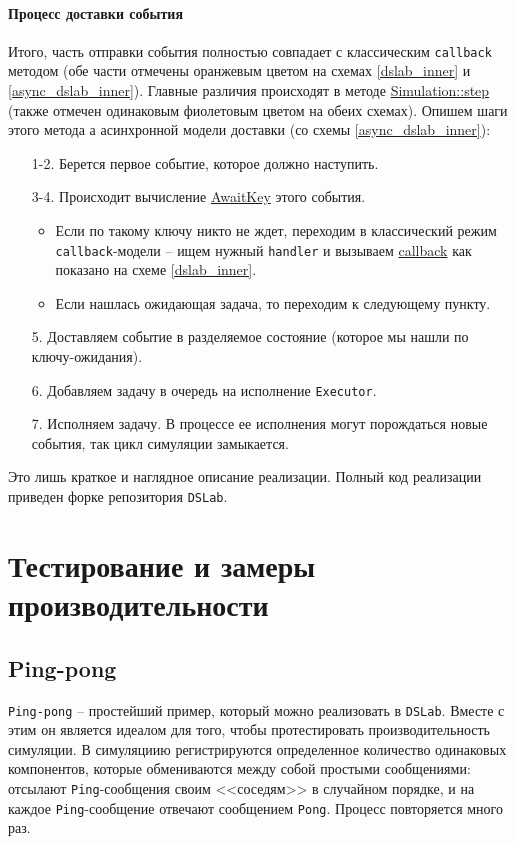 \paragraph{Процесс доставки события} Итого, часть отправки события полностью совпадает с классическим \texttt{callback} методом (обе части отмечены оранжевым цветом на схемах \ref{dslab_inner} и \ref{async_dslab_inner}). Главные различия происходят в методе \hyperref[Simulation::step]{Simulation::step} (также отмечен одинаковым фиолетовым цветом на обеих схемах). Опишем шаги этого метода а асинхронной модели доставки (со схемы \ref{async_dslab_inner}):
\begin{enumerate}
    \item[1-2.] Берется первое событие, которое должно наступить. 
    \item[3-4.] Происходит вычисление \hyperref[awaitkey]{AwaitKey} этого события.
    \begin{itemize} \item Если по такому ключу никто не ждет, переходим в классический режим \texttt{callback}-модели -- ищем нужный \texttt{handler} и вызываем \hyperref[fnon]{callback} как показано на схеме \ref{dslab_inner}.
        \item Если нашлась ожидающая задача, то переходим к следующему пункту.
    \end{itemize}
    \item[5.] Доставляем событие в разделяемое состояние (которое мы нашли по ключу-ожидания).
    \item[6.] Добавляем задачу в очередь на исполнение \texttt{Executor}.
    \item[7.] Исполняем задачу. В процессе ее исполнения могут порождаться новые события, так цикл симуляции замыкается.  
\end{enumerate}

Это лишь краткое и наглядное описание реализации. Полный код реализации приведен форке репозитория \texttt{DSLab}\cite{async-dslab-core}. 
\section{Тестирование и замеры производительности} \label{async-testing}

\subsection{Ping-pong}

\texttt{Ping-pong} -- простейший пример, который можно реализовать в \texttt{DSLab}. Вместе с этим он является идеалом для того, чтобы протестировать производительность симуляции. В симуляциию регистрируются определенное количество одинаковых компонентов, которые обмениваются между собой простыми сообщениями: отсылают \texttt{Ping}-сообщения своим <<соседям>> в случайном порядке, и на каждое \texttt{Ping}-сообщение отвечают сообщением \texttt{Pong}. Процесс повторяется много раз.

